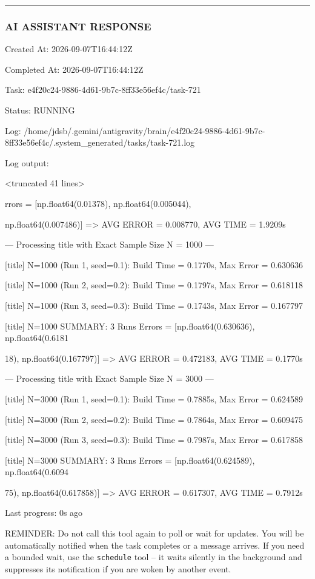 \documentclass[11pt,a4paper]{article}
\begin{document}
\hrule

\subsubsection{AI ASSISTANT RESPONSE}

Created At: 2026-09-07T16:44:12Z

Completed At: 2026-09-07T16:44:12Z

Task: e4f20c24-9886-4d61-9b7c-8ff33e56ef4c/task-721

Status: RUNNING

Log: /home/jdsb/.gemini/antigravity/brain/e4f20c24-9886-4d61-9b7c-8ff33e56ef4c/.system\_generated/tasks/task-721.log

Log output:

<truncated 41 lines>

rrors = [np.float64(0.01378), np.float64(0.005044),

np.float64(0.007486)] => AVG ERROR = 0.008770, AVG TIME = 1.9209s


--- Processing title with Exact Sample Size N = 1000 ---

[title] N=1000 (Run 1, seed=0.1): Build Time = 0.1770s, Max Error = 0.630636

[title] N=1000 (Run 2, seed=0.2): Build Time = 0.1797s, Max Error = 0.618118

[title] N=1000 (Run 3, seed=0.3): Build Time = 0.1743s, Max Error = 0.167797

[title] N=1000 SUMMARY: 3 Runs Errors = [np.float64(0.630636), np.float64(0.6181

18), np.float64(0.167797)] => AVG ERROR = 0.472183, AVG TIME = 0.1770s

--- Processing title with Exact Sample Size N = 3000 ---

[title] N=3000 (Run 1, seed=0.1): Build Time = 0.7885s, Max Error = 0.624589

[title] N=3000 (Run 2, seed=0.2): Build Time = 0.7864s, Max Error = 0.609475

[title] N=3000 (Run 3, seed=0.3): Build Time = 0.7987s, Max Error = 0.617858

[title] N=3000 SUMMARY: 3 Runs Errors = [np.float64(0.624589), np.float64(0.6094

75), np.float64(0.617858)] => AVG ERROR = 0.617307, AVG TIME = 0.7912s


Last progress: 0s ago



REMINDER: Do not call this tool again to poll or wait for updates. You will be automatically notified when the task completes or a message arrives. If you need a bounded wait, use the \texttt{schedule} tool -- it waits silently in the background and suppresses its notification if you are woken by another event.
\end{document}
